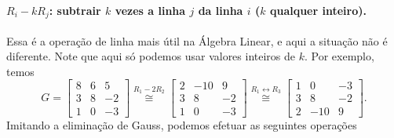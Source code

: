     	\paragraph{$R_i - kR_j$: subtrair $k$ vezes a linha $j$ da linha $i$ ($k$ qualquer inteiro).} 
    	Essa é a operação de linha mais útil na Álgebra Linear, e aqui a situação não é
    	diferente. Note que aqui só podemos 
    	usar valores inteiros de $k$.
    	Por exemplo, temos
    	\[
    	G = \begin{bmatrix}
    	8 & 6 & 5 \\
    	3 & 8 & -2 \\
    	1 & 0 & -3
    	\end{bmatrix} \stackrel{R_1 - 2R_2}{\cong} \begin{bmatrix}
    	2 & -10 & 9 \\
    	3 & 8 & -2 \\
    	1 & 0 & -3
    	\end{bmatrix} \stackrel{R_1\leftrightarrow R_3}{\cong} \begin{bmatrix}
    	1 & 0 & -3 \\
    	3 & 8 & -2 \\
    	2 & -10 & 9
    	\end{bmatrix}.
    	\]
    	Imitando a eliminação de Gauss, podemos efetuar as seguintes operações
